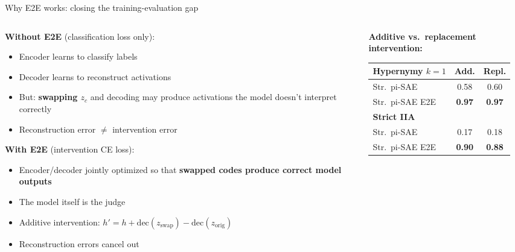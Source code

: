 \documentclass[aspectratio=169,11pt]{beamer}
\begin{document}
\begin{frame}{Why E2E works: closing the training-evaluation gap}

\begin{columns}[T]
\begin{column}{0.50\textwidth}
\textbf{Without E2E} (classification loss only):
\begin{itemize}
  \item {\small Encoder learns to classify labels}
  \item {\small Decoder learns to reconstruct activations}
  \item {\small But: \textbf{swapping $z_c$} and decoding may produce activations the model doesn't interpret correctly}
  \item {\small Reconstruction error $\neq$ intervention error}
\end{itemize}

\vspace{0.5em}
\textbf{With E2E} (intervention CE loss):
\begin{itemize}
  \item {\small Encoder/decoder jointly optimized so that \textbf{swapped codes produce correct model outputs}}
  \item {\small The model itself is the judge}
  \item {\small Additive intervention: $h' = h + \text{dec}(z_{\text{swap}}) - \text{dec}(z_{\text{orig}})$}
  \item {\small Reconstruction errors cancel out}
\end{itemize}
\end{column}
\begin{column}{0.48\textwidth}

\vspace{0.3em}
{\scriptsize \textbf{Additive vs.\ replacement intervention:}}

\vspace{0.2em}
{\scriptsize\centering
\setlength{\tabcolsep}{3pt}
\renewcommand{\arraystretch}{1.0}
\begin{tabular}{@{}l|cc@{}}
\toprule
\textbf{Hypernymy $k{=}1$} & \textbf{Add.} & \textbf{Repl.} \\
\midrule
Str.\ pi-SAE     & 0.58 & 0.60 \\
Str.\ pi-SAE E2E & \textbf{0.97} & \textbf{0.97} \\
\midrule
\textbf{Strict IIA} & & \\
\midrule
Str.\ pi-SAE     & 0.17 & 0.18 \\
Str.\ pi-SAE E2E & \textbf{0.90} & \textbf{0.88} \\
\bottomrule
\end{tabular}
}


\end{column}
\end{columns}
\end{frame}
\end{document}
